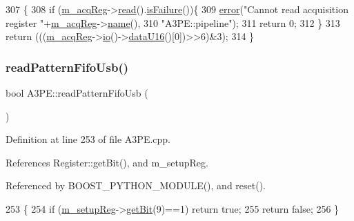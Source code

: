 \begin{DoxyCode}
307                            \{
308   \textcolor{keywordflow}{if} (\hyperlink{classA3PE_abaf426f4c9192537117b77f9f4821e04}{m\_acqReg}->\hyperlink{classIOobject_aa07610c11963b1db6710e3c76ceea456}{read}().\hyperlink{classStatusCode_a5dd22dc6eb2c52fc4cabc58f6dea2eb7}{isFailure}())\{
309     \hyperlink{classObject_a204a95f57818c0f811933917a30eff45}{error}(\textcolor{stringliteral}{"Cannot read acquisition register "}+\hyperlink{classA3PE_abaf426f4c9192537117b77f9f4821e04}{m\_acqReg}->\hyperlink{classObject_a300f4c05dd468c7bb8b3c968868443c1}{name}(),
310       \textcolor{stringliteral}{"A3PE::pipeline"});
311     \textcolor{keywordflow}{return} 0;
312   \}
313   \textcolor{keywordflow}{return} (((\hyperlink{classA3PE_abaf426f4c9192537117b77f9f4821e04}{m\_acqReg}->\hyperlink{classIOobject_af04fb94137c3d86849f478ac5afab5d1}{io}()->\hyperlink{classIOdata_a8d8528b731c6cf117f8c5b9b2473390c}{dataU16}()[0])>>6)&3);
314 \}
\end{DoxyCode}
\mbox{\label{classA3PE_a3bb47f43f9f98d8a0d825aadc04e5ab6}} 
\subsubsection{\texorpdfstring{read\+Pattern\+Fifo\+Usb()}{readPatternFifoUsb()}}
{\footnotesize\ttfamily bool A3\+P\+E\+::read\+Pattern\+Fifo\+Usb (\begin{DoxyParamCaption}{ }\end{DoxyParamCaption})}



Definition at line 253 of file A3\+P\+E.\+cpp.



References Register\+::get\+Bit(), and m\+\_\+setup\+Reg.



Referenced by B\+O\+O\+S\+T\+\_\+\+P\+Y\+T\+H\+O\+N\+\_\+\+M\+O\+D\+U\+L\+E(), and reset().


\begin{DoxyCode}
253                              \{
254   \textcolor{keywordflow}{if} (\hyperlink{classA3PE_a142fa10b7e705c4701ae21678ec2ec8a}{m\_setupReg}->\hyperlink{classRegister_a5d27c9ff548817eee097ba4fdc8e8f69}{getBit}(9)==1) \textcolor{keywordflow}{return} \textcolor{keyword}{true};
255   \textcolor{keywordflow}{return} \textcolor{keyword}{false};
256 \}
\end{DoxyCode}
\mbox{\label{classA3PE_af3152e461d446f442cfa7b69456ac276}} 
